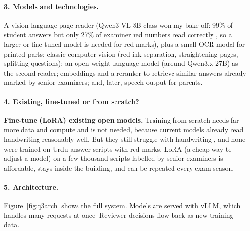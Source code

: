 \paragraph{3. Models and technologies.} A vision-language page reader (Qwen3-VL-8B class won my bake-off: 99\% of student
answers but only 27\% of examiner red numbers read correctly , so a larger or fine-tuned model is needed for red
marks), plus a small OCR model for printed parts; classic computer vision (red-ink separation, straightening pages,
splitting questions); an open-weight language model (around Qwen3.x 27B) as the second reader; embeddings and a reranker
to retrieve similar answers already marked by senior examiners; and, later, speech output for parents.

\paragraph{4. Existing, fine-tuned or from scratch?} \textbf{Fine-tune (LoRA) existing open models.} Training from scratch
needs far more data and compute and is not needed, because current models already read handwriting reasonably well.
But they still struggle with handwriting \citep{wildhandbench2026}, and none were trained on Urdu answer scripts with red
marks. LoRA (a cheap way to adjust a model) on a few thousand scripts labelled by senior examiners is affordable, stays
inside the building, and can be repeated every exam season.

\paragraph{5. Architecture.} Figure~\ref{fig:q3arch} shows the full system. Models are served with vLLM, which handles many
requests at once. Reviewer decisions flow back as new training data.

